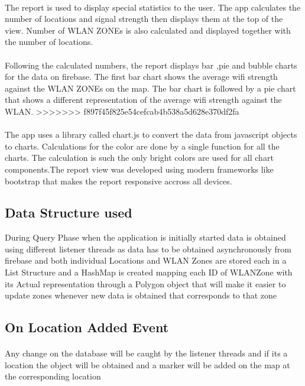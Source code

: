 \paragraph{}The report is used to display special statistics to the user. The app calculates the number of locations and signal strength then displays them at the top of the view. Number of WLAN ZONEs is also calculated and displayed together with the number of locations.

\paragraph{}Following the calculated numbers, the report displays bar ,pie and bubble charts for the data on firebase. The first bar chart shows the average wifi strength against the WLAN ZONEs on the map. The bar chart is followed by a pie chart that shows a different representation of the average wifi strength against the WLAN.
>>>>>>> f897f45f825e54cefcab4b538a5d628e370df2fa

\paragraph{}The app uses a library called chart.js to convert the data from javascript objects to charts. Calculations for the color are done by a single function for all the charts. The calculation is such the only bright colors are used for all chart components.The report view was developed using modern frameworks like bootstrap that makes the report responsive accross all devices.

\subsection*{Data Structure used}

During Query Phase when the application is initially started data is obtained using different listener threads as data has to be obtained asynchronously from firebase and both individual Locations and WLAN Zones are stored each in a List Structure and a HashMap is created mapping each ID of WLANZone with its Actual representation through a Polygon object that will make it easier to update zones whenever new data is obtained that corresponds to that zone 

\subsection*{On Location Added Event} 
\paragraph{}Any change on the database will be caught by the listener threads and if its a location the object will be obtained and a marker will be added on the map at the corresponding location      

